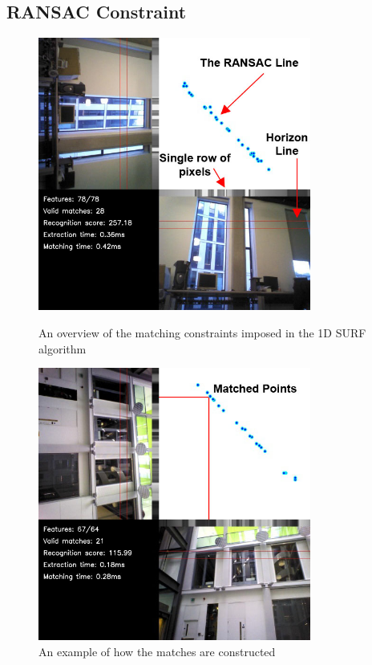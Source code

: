 \documentclass{report}
\begin{document}
\subsection{RANSAC Constraint}
\label{sec:ransacConstraint}


\begin{figure}[ht!]
\begin{minipage}[b]{0.5\linewidth}
  \centering
    \includegraphics[width=0.8\textwidth]{../Drawings/constraints/matchingLabelled.jpg}
    \caption{An overview of the matching constraints imposed in the 1D SURF algorithm} 
    \label{fig:ransacOverview}
\end{minipage}
\begin{minipage}[b]{0.5\linewidth}
  \centering
    \includegraphics[width=0.8\textwidth]{../Drawings/constraints/matchedPoints.jpg}
    \caption{An example of how the matches are constructed} 
    \label{fig:ransacExample}
\end{minipage}
\end{figure}
\end{document}
